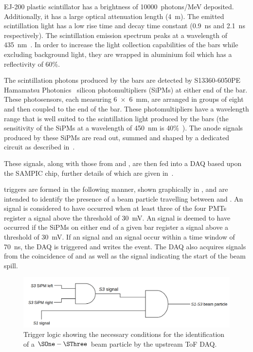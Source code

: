 EJ-200 plastic scintillator has a brightness of \num{10000}~photons/MeV deposited.
Additionally, it has a large optical attenuation length (\SI{4}{\metre}).
The emitted scintillation light has a low rise time and decay time constant (\SI{0.9}{\nano\second} and \SI{2.1}{\nano\second} respectively).
The scintillation emission spectrum peaks at a wavelength of \SI{435}{\nano\metre}~\cite{ej200}.
In order to increase the light collection capabilities of the bars while excluding background light, they are wrapped in aluminium foil which has a reflectivity of 60\%.

The scintillation photons produced by the bars are detected by S13360-6050PE Hamamatsu Photonics~\cite{hamamatsu} silicon photomultipliers (SiPMs) at either end of the bar.
These photosensors, each measuring \SI{6 x 6}{\milli\metre}, are arranged in groups of eight and then coupled to the end of the bar.
These photomultipliers have a wavelength range that is well suited to the scintillation light produced by the bars (the sensitivity of the SiPMs at a wavelength of \SI{450}{\nano\metre} is 40\%~\cite{hamamatsu}).
The anode signals produced by these SiPMs are read out, summed and shaped by a dedicated circuit as described in~\cite{s3SiPM}.

These signals, along with those from \SOne and \STwo, are then fed into a DAQ based upon the SAMPIC chip, further details of which are given in~\cite{sampic}.

\SThree triggers are formed in the following manner, shown graphically in , and are intended to identify the presence of a beam particle travelling between \SOne and \SThree.
An \SOne signal is considered to have occurred when at least three of the four \SOne PMTs register a signal above the threshold of \SI{30}{\milli\volt}.
An \SThree signal is deemed to have occurred if the SiPMs on either end of a given bar register a signal above a threshold of \SI{30}{\milli\volt}.
If an \SOne signal and an \SThree signal occur within a time window of \SI{70}{\nano\second}, the DAQ is triggered and writes the event.
The DAQ also acquires signals from the coincidence of \SOne and \STwo as well as the signal indicating the start of the beam spill.

\begin{figure}[h]
  \centering
  \includegraphics[width=.8\linewidth]{files/figures/hptpc_beam_flux/utofTrig}
  \caption[Trigger logic for the upstream time of flight DAQ]{Trigger logic showing the necessary conditions for the identification of a $\SOne-\SThree$ beam particle by the upstream ToF DAQ.}
  \label{fig:s3Trigger}
\end{figure}


